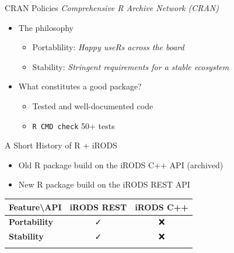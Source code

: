 \documentclass[
  ignorenonframetext,
]{beamer}
\providecommand{\tightlist}{%
  \setlength{\itemsep}{0pt}\setlength{\parskip}{0pt}}\usepackage{longtable,booktabs,array}
\begin{document}
\begin{frame}[fragile]{CRAN Policies}
\protect\hypertarget{cran-policies}{}
\emph{Comprehensive R Archive Network (CRAN)}

\begin{itemize}
\tightlist
\item
  The philosophy

  \begin{itemize}
  \tightlist
  \item
    Portablility: \emph{Happy useRs across the board}
  \item
    Stability: \emph{Stringent requirements for a stable ecosystem}
  \end{itemize}
\item
  What constitutes a good package?

  \begin{itemize}
  \tightlist
  \item
    Tested and well-documented code
  \item
    \texttt{R\ CMD\ check} 50+ tests
  \end{itemize}
\end{itemize}

\end{frame}

\begin{frame}{A Short History of R + iRODS}
\protect\hypertarget{a-short-history-of-r-irods}{}
\begin{itemize}
\tightlist
\item
  Old R package build on the iRODS C++ API (archived)
\item
  New R package build on the iRODS REST API
\end{itemize}

\begin{longtable}[]{@{}lcc@{}}
\toprule\noalign{}
Feature\textbackslash API & iRODS REST & iRODS C++ \\
\midrule\noalign{}
\endhead
\textbf{Portability} & ✓ & ❌ \\
\textbf{Stability} & ✓ & ❌ \\
\bottomrule\noalign{}
\end{longtable}
\end{frame}
\end{document}
